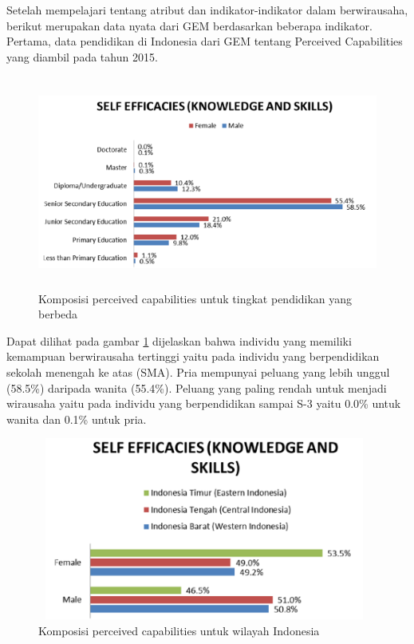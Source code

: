 \documentclass[a4paper,twoside]{article}
\begin{document}
\begin{enumerate}
Setelah mempelajari tentang atribut dan indikator-indikator dalam berwirausaha, berikut merupakan data nyata dari GEM berdasarkan beberapa indikator. Pertama, data pendidikan di Indonesia dari GEM tentang Perceived Capabilities yang diambil pada tahun 2015.

\begin{figure} [H]
	\centering  
	\includegraphics[width=14cm, height=7cm]{PCPendidikan} 
	\caption[Komposisi perceived capabilities untuk tingkat pendidikan yang berbeda]{Komposisi perceived capabilities untuk tingkat pendidikan yang berbeda} 
	\label{fig:PCPendidikan} 
\end{figure}

Dapat dilihat pada gambar \ref{fig:PCPendidikan} dijelaskan bahwa individu yang memiliki kemampuan berwirausaha tertinggi yaitu pada individu yang berpendidikan sekolah menengah ke atas (SMA). Pria mempunyai peluang yang lebih unggul (58.5\%) daripada wanita (55.4\%). Peluang yang paling rendah untuk menjadi wirausaha yaitu pada individu yang berpendidikan sampai S-3 yaitu 0.0\% untuk wanita dan 0.1\% untuk pria. 

\begin{figure} [H]
	\centering  
	\includegraphics[width=11cm, height=6cm]{PCRegion} 
	\caption[Komposisi perceived capabilities untuk wilayah Indonesia]{Komposisi perceived capabilities untuk wilayah Indonesia} 
	\label{fig:PCRegion} 
\end{figure}


\end{enumerate}
\end{document}
